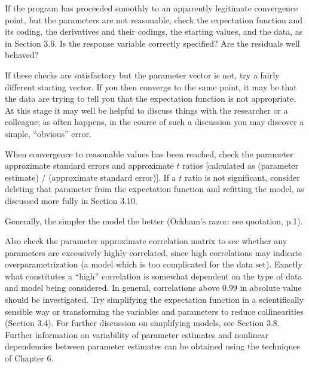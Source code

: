 If the program has proceeded smoothly to an apparently
legitimate convergence point, but the parameters are not
reasonable, check the expectation function and its coding, the derivatives
and their codings, the starting values, and the data, as in
Section 3.6.
Is the response variable correctly specified?
Are the residuals well behaved?

If these checks are satisfactory but the parameter vector is not,
try a fairly different starting vector.
If you then converge to the same point, it may be that the data
are trying to tell you that the expectation function is not
appropriate.
At this stage it may well be helpful to discuss things with the
researcher or a colleague;  as
often happens, in the course of such a discussion you may
discover a simple, ``obvious'' error.

When convergence to reasonable values has been reached, check the
parameter approximate standard errors and approximate $t$ ratios
[calculated as (parameter estimate) / (approximate standard error)].
If a $t$ ratio is not significant,
consider deleting that parameter from the expectation
function and refitting the model, as discussed more fully
in Section 3.10.

Generally, the simpler the model the better
(Ockham's razor: see quotation, p.1).

Also check the parameter approximate correlation matrix to see
whether any parameters are excessively highly correlated,
since high correlations may indicate overparametrization
(a model which is too complicated for the data set).
Exactly what constitutes a ``high''
correlation is somewhat dependent on the type of data and model
being considered.
In general, correlations above 0.99 in absolute value should be
investigated.
Try simplifying the expectation function in a
scientifically sensible way or transforming the variables and
parameters to reduce collinearities (Section 3.4).
For further discussion on simplifying models, see Section 3.8.
Further information on variability of parameter estimates and
nonlinear dependencies between parameter estimates can be obtained
using the techniques of Chapter 6.


